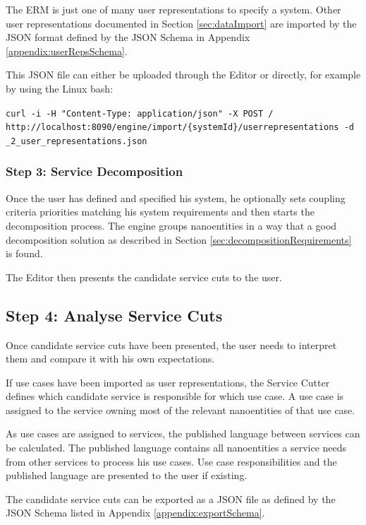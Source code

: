 The \gls{ERM} is just one of many user representations to specify a system. Other user representations documented in Section \ref{sec:dataImport} are imported by the \gls{JSON} format defined by the \gls{JSON} Schema in Appendix \ref{appendix:userRepsSchema}.

This JSON file can either be uploaded through the Editor or directly, for example by using the Linux bash:

\texttt{curl -i -H "Content-Type: application/json" -X POST /} \\
\-\hspace{40pt}\texttt{http://localhost:8090/engine/import/\{systemId\}/userrepresentations -d \@booking\_2\_user\_representations.json}

\subsubsection{Step 3: Service Decomposition}

Once the user has defined and specified his system, he optionally sets coupling criteria priorities matching his system requirements and then starts the decomposition process. The engine groups nanoentities in a way that a good decomposition solution as described in Section \ref{sec:decompositionRequirements} is found. 

The Editor then presents the candidate service cuts to the user.

\subsection{Step 4: Analyse Service Cuts}

Once candidate service cuts have been presented, the user needs to interpret them and compare it with his own expectations. 

If use cases have been imported as user representations, the Service Cutter defines which candidate service is responsible for which use case. A use case is assigned to the service owning most of the relevant nanoentities of that use case. 

As use cases are assigned to services, the published language between services can be calculated. The published language contains all nanoentities a service needs from other services to process his use cases. Use case responsibilities and the published language are presented to the user if existing. 

The candidate service cuts can be exported as a \gls{JSON} file as defined by the \gls{JSON} Schema listed in Appendix \ref{appendix:exportSchema}.

